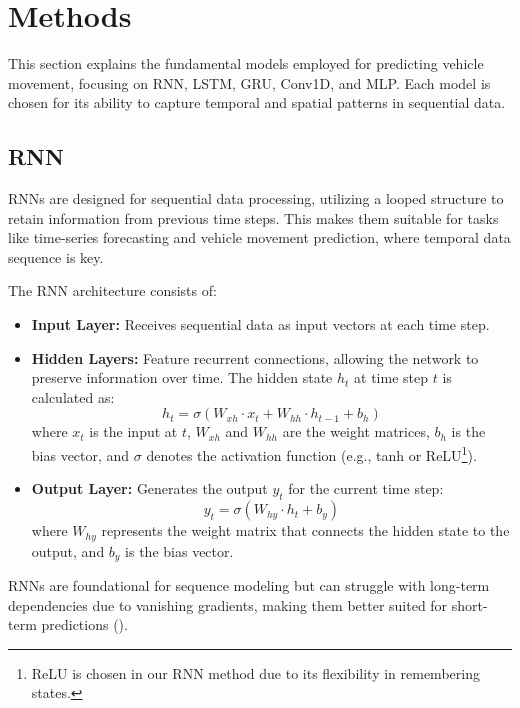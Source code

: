 \documentclass[journal,onecolumn]{IEEEtran}
\begin{document}
{\section{Methods} \label{methods}
This section explains the fundamental models employed for predicting vehicle movement, focusing on RNN, LSTM, GRU, Conv1D, and MLP. Each model is chosen for its ability to capture temporal and spatial patterns in sequential data.

\subsection{RNN}
RNNs are designed for sequential data processing, utilizing a looped structure to retain information from previous time steps. This makes them suitable for tasks like time-series forecasting and vehicle movement prediction, where temporal data sequence is key.

The RNN architecture consists of:
\begin{itemize}
    \item \textbf{Input Layer:} Receives sequential data as input vectors at each time step.
    \item \textbf{Hidden Layers:} Feature recurrent connections, allowing the network to preserve information over time. The hidden state \( h_t \) at time step \( t \) is calculated as:
    \[
    h_t = \sigma(W_{xh} \cdot x_t + W_{hh} \cdot h_{t-1} + b_h)
    \]
    where \( x_t \) is the input at \( t \), \( W_{xh} \) and \( W_{hh} \) are the weight matrices, \( b_h \) is the bias vector, and \( \sigma \) denotes the activation function (e.g., tanh or ReLU\footnote{ReLU is chosen in our RNN method due to its flexibility in remembering states.}).
    \item \textbf{Output Layer:} Generates the output \( y_t \) for the current time step:
    \[
    y_t = \sigma(W_{hy} \cdot h_t + b_y)
    \]
    where \( W_{hy} \) represents the weight matrix that connects the hidden state to the output, and \( b_y \) is the bias vector.
\end{itemize}

RNNs are foundational for sequence modeling but can struggle with long-term dependencies due to vanishing gradients, making them better suited for short-term predictions (\cite{prep23ghojogh}).

}
\end{document}
